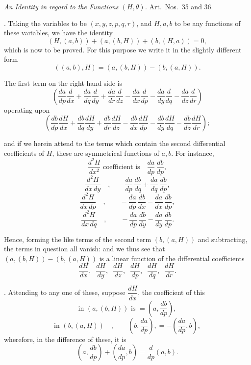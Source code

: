 \documentclass[11pt,a4paper]{article}
\begin{document}
\bigskip

\begin{center}
\emph{An Identity in regard to the Functions $(H, \theta)$.} Art.\ Nos.\ 35 and 36.
\end{center}

\medskip

. Taking the variables to be $(x, y, z, p, q, r)$, and $H, a, b$ to be any functions of these variables, we have the identity
\[
(H, (a, b)) + (a, (b, H)) + (b, (H, a)) = 0,
\]
which is now to be proved. For this purpose we write it in the slightly different form
\[
((a, b), H) = (a, (b, H)) - (b, (a, H)).
\]

The first term on the right-hand side is
\[
\left( \frac{da}{dp}\frac{d}{dx} + \frac{da}{dq}\frac{d}{dy} + \frac{da}{dr}\frac{d}{dz} - \frac{da}{dx}\frac{d}{dp} - \frac{da}{dy}\frac{d}{dq} - \frac{da}{dz}\frac{d}{dr} \right)
\]
operating upon
\[
\left( \frac{db}{dp}\frac{dH}{dx} + \frac{db}{dq}\frac{dH}{dy} + \frac{db}{dr}\frac{dH}{dz} - \frac{db}{dx}\frac{dH}{dp} - \frac{db}{dy}\frac{dH}{dq} - \frac{db}{dz}\frac{dH}{dr} \right);
\]

\newpage


and if we herein attend to the terms which contain the second differential coefficients of $H$, these are symmetrical functions of $a, b$. For instance,
\[
\frac{d^{2}H}{dx^{2}} \text{ coefficient is} \quad \frac{da}{dp}\,\frac{db}{dp},
\]
\[
\frac{d^{2}H}{dx\,dy} \quad\!\!,\quad\!\!\quad \frac{da}{dp}\,\frac{db}{dq} + \frac{da}{dq}\,\frac{db}{dp},
\]
\[
\frac{d^{2}H}{dx\,dp} \quad\!\!,\quad\!\!\quad - \frac{da}{dp}\,\frac{db}{dx} - \frac{da}{dx}\,\frac{db}{dp},
\]
\[
\frac{d^{2}H}{dx\,dq} \quad\!\!,\quad\!\!\quad - \frac{da}{dp}\,\frac{db}{dy} - \frac{da}{dy}\,\frac{db}{dp}.
\]

Hence, forming the like terms of the second term $(b, (a, H))$ and subtracting, the terms in question all vanish: and we thus see that $(a, (b, H)) - (b, (a, H))$ is a linear function of the differential coefficients
\[
\frac{dH}{dx}, \;\; \frac{dH}{dy}, \;\; \frac{dH}{dz}, \;\; \frac{dH}{dp}, \;\; \frac{dH}{dq}, \;\; \frac{dH}{dr}.
\]

\medskip

. Attending to any one of these, suppose $\dfrac{dH}{dx}$, the coefficient of this
\[
\text{in } (a, (b, H)) \text{ is } = \left( a, \frac{db}{dp} \right),
\]
\[
\text{in } (b, (a, H)) \quad\!\!,\quad\!\!\quad \left( b, \frac{da}{dp} \right), = - \left( \frac{da}{dp}, b \right),
\]
wherefore, in the difference of these, it is
\[
\left( a, \frac{db}{dp} \right) + \left( \frac{da}{dp}, b \right) = \frac{d}{dp}(a, b).
\]
\end{document}
